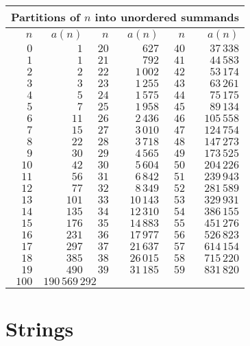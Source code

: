 \documentclass{article}
\begin{document}
\begin{center}
\begin{tabular}{|r|r|r|r|r|r|}
\hline
\multicolumn{6}{|l|}{Partitions of $n$ into unordered summands} \\
\hline
$n$ & $a(n)$ & $n$ & $a(n)$ & $n$ & $a(n)$ \\
\hline
$0$ & $1$ & $20$ & $627$ & $40$ & $37\,338$ \\
\hline
$1$ & $1$ & $21$ & $792$ & $41$ & $44\,583$ \\
\hline
$2$ & $2$ & $22$ & $1\,002$ & $42$ & $53\,174$ \\
\hline
$3$ & $3$ & $23$ & $1\,255$ & $43$ & $63\,261$ \\
\hline
$4$ & $5$ & $24$ & $1\,575$ & $44$ & $75\,175$ \\
\hline
$5$ & $7$ & $25$ & $1\,958$ & $45$ & $89\,134$ \\
\hline
$6$ & $11$ & $26$ & $2\,436$ & $46$ & $105\,558$ \\
\hline
$7$ & $15$ & $27$ & $3\,010$ & $47$ & $124\,754$ \\
\hline
$8$ & $22$ & $28$ & $3\,718$ & $48$ & $147\,273$ \\
\hline
$9$ & $30$ & $29$ & $4\,565$ & $49$ & $173\,525$ \\
\hline
$10$ & $42$ & $30$ & $5\,604$ & $50$ & $204\,226$ \\
\hline
$11$ & $56$ & $31$ & $6\,842$ & $51$ & $239\,943$ \\
\hline
$12$ & $77$ & $32$ & $8\,349$ & $52$ & $281\,589$ \\
\hline
$13$ & $101$ & $33$ & $10\,143$ & $53$ & $329\,931$ \\
\hline
$14$ & $135$ & $34$ & $12\,310$ & $54$ & $386\,155$ \\
\hline
$15$ & $176$ & $35$ & $14\,883$ & $55$ & $451\,276$ \\
\hline
$16$ & $231$ & $36$ & $17\,977$ & $56$ & $526\,823$ \\
\hline
$17$ & $297$ & $37$ & $21\,637$ & $57$ & $614\,154$ \\
\hline
$18$ & $385$ & $38$ & $26\,015$ & $58$ & $715\,220$ \\
\hline
$19$ & $490$ & $39$ & $31\,185$ & $59$ & $831\,820$ \\
\hline
$100$ & \multicolumn{5}{|l|}{$190\,569\,292$} \\
\hline
\end{tabular}
\end{center}
\section{Strings}
\end{document}
